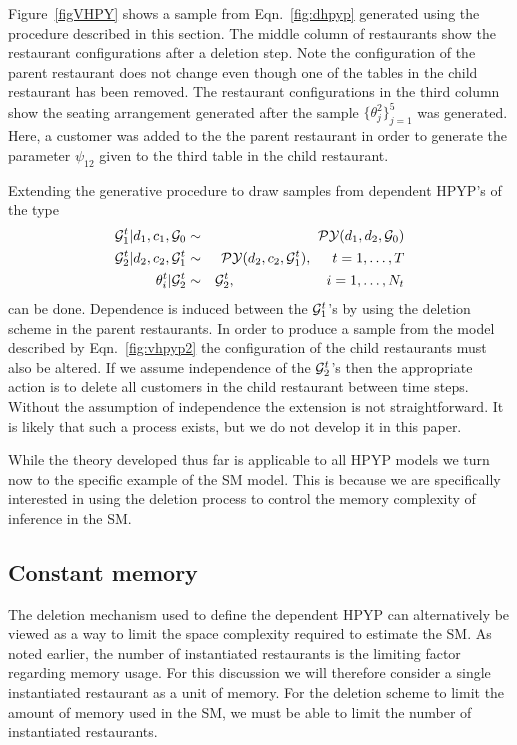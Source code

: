 Figure~\ref{figVHPY} shows a sample from Eqn.~\ref{fig:dhpyp} generated using the procedure described in this section. The middle column of restaurants show the restaurant configurations after a deletion step.  Note the configuration of the parent restaurant does not change even though one of the tables in the child restaurant has been removed.  The restaurant configurations in the third column show the seating arrangement  generated after the sample $\{ \theta_j^2 \}_{j = 1}^5$ was generated.  Here, a customer was added to the the parent restaurant in order to generate the parameter $\psi_{12}$  given to the third table in the child restaurant.

Extending the generative procedure to draw samples from dependent HPYP's of the type
%
\begin{eqnarray}
\G_1^t | d_1, c_1, \G_0  &\sim& \PY(d_1,d_2,\G_0)  \label{fig:vhpyp2}\\
\G_2^t | d_2, c_2, \G_1^t &\sim& \PY(d_2, c_2, \G_1^t),  \hspace{.5cm} t = 1,\dots, T \nonumber \\
\theta^t_i | \G_2^t &\sim& \G_2^t, \hspace{2.28cm} i = 1, \dots, N_t \nonumber
\end{eqnarray}
%
can be done. Dependence is induced between the $\G_1^t$'s by using the deletion scheme in the parent restaurants.  In order to produce a sample from the model described by Eqn.~\ref{fig:vhpyp2} the configuration of the child restaurants must also be altered.  If we assume independence of the $\G_2^t$'s then the appropriate action is to delete all customers in the child restaurant between time steps. Without the assumption of independence the extension is not straightforward. It is likely that such a process exists, but we do not develop it in this paper.

While the theory developed thus far is applicable to all HPYP models we turn now to the specific example of the SM model.  This is because we are specifically interested in using the deletion process to control the memory complexity of inference in the SM.

\subsection{Constant memory}
The deletion mechanism used to define the dependent HPYP can alternatively be viewed as a way to limit the space complexity required to estimate the SM. As noted earlier, the number of instantiated restaurants is the limiting factor regarding memory usage.  For this discussion we will therefore consider a single instantiated restaurant as a unit of memory. For the deletion scheme to limit the amount of memory used in the SM, we must be able to limit the number of instantiated restaurants.

